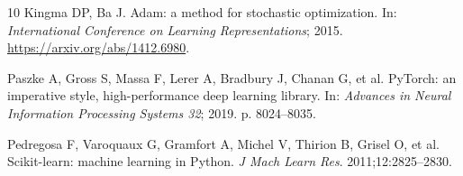 \begin{thebibliography}{10}
Kingma DP, Ba J.
Adam: a method for stochastic optimization.
In: \emph{International Conference on Learning Representations}; 2015.
\url{https://arxiv.org/abs/1412.6980}.

Paszke A, Gross S, Massa F, Lerer A, Bradbury J, Chanan G, et al.
PyTorch: an imperative style, high-performance deep learning library.
In: \emph{Advances in Neural Information Processing Systems 32}; 2019.
p. 8024--8035.

Pedregosa F, Varoquaux G, Gramfort A, Michel V, Thirion B, Grisel O, et al.
Scikit-learn: machine learning in Python.
\emph{J Mach Learn Res}. 2011;12:2825--2830.

\end{thebibliography}
